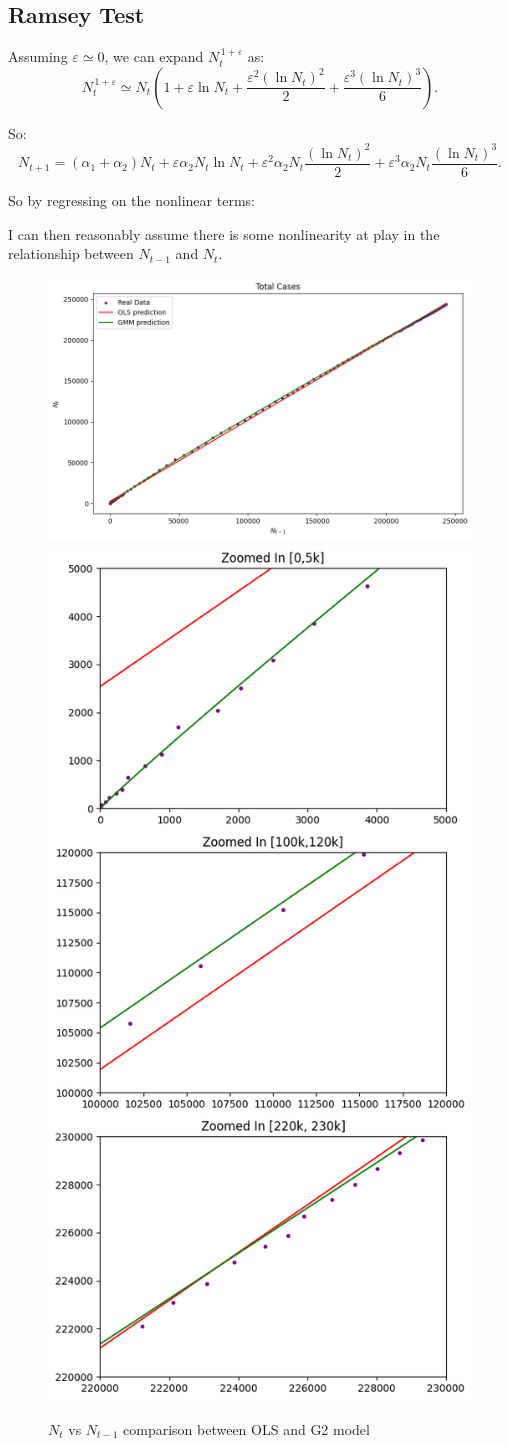     \subsection{Ramsey Test}

    Assuming $\varepsilon \simeq 0$, we can expand $N_{t}^{\,1+\varepsilon}$ as:
    \begin{equation}
        N_{t}^{\,1+\varepsilon} \simeq N_{t} \left( 1 + \varepsilon \ln N_{t} + \frac{\varepsilon^2 (\ln N_{t})^2}{2} + \frac{\varepsilon^3 (\ln N_{t})^3}{6} \right).
    \end{equation}

    So:
        \begin{equation}
        N_{t+1} = (\alpha_1 + \alpha_2) N_{t} + \varepsilon \alpha_2 N_{t}\ln N_{t} + \varepsilon^2 \alpha_2 N_{t} \frac{ (\ln N_{t})^2}{2} + \varepsilon^3 \alpha_2 N_{t} \frac{(\ln N_{t})^3}{6}.
        \end{equation}

    So by regressing on the nonlinear terms:

    

    I can then reasonably assume there is some nonlinearity at play in the relationship between $N_{t-1}$ and $N_t$.
    \begin{figure}[h!]
            \centering
            \includegraphics[width=0.6\linewidth]{plots/regression_comparison_1}\quad
            \includegraphics[width=0.2\linewidth]{plots/regression_comparison_2}
            \caption{$N_t$ vs $N_{t-1}$ comparison between OLS and G2 model}
            \label{fig:plot_gmm_ols_comp}
        \end{figure}


